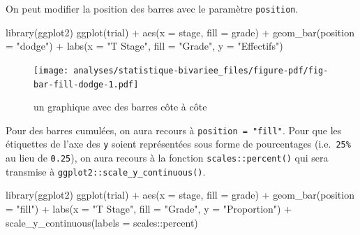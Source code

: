 \documentclass[
  letterpaper,
  DIV=11,
  numbers=noendperiod,
  oneside]{scrreprt}
\newenvironment{Shaded}{\begin{snugshade}}{\end{snugshade}}
\newcommand{\AttributeTok}[1]{\textcolor[rgb]{0.40,0.45,0.13}{#1}}
\newcommand{\FunctionTok}[1]{\textcolor[rgb]{0.28,0.35,0.67}{#1}}
\newcommand{\NormalTok}[1]{\textcolor[rgb]{0.00,0.23,0.31}{#1}}
\newcommand{\SpecialCharTok}[1]{\textcolor[rgb]{0.37,0.37,0.37}{#1}}
\newcommand{\StringTok}[1]{\textcolor[rgb]{0.13,0.47,0.30}{#1}}
\begin{document}
On peut modifier la position des barres avec le paramètre
\texttt{position}.

\begin{Shaded}
\begin{Highlighting}[]
\FunctionTok{library}\NormalTok{(ggplot2)}
\FunctionTok{ggplot}\NormalTok{(trial) }\SpecialCharTok{+}
  \FunctionTok{aes}\NormalTok{(}\AttributeTok{x =}\NormalTok{ stage, }\AttributeTok{fill =}\NormalTok{ grade) }\SpecialCharTok{+}
  \FunctionTok{geom\_bar}\NormalTok{(}\AttributeTok{position =} \StringTok{"dodge"}\NormalTok{) }\SpecialCharTok{+}
  \FunctionTok{labs}\NormalTok{(}\AttributeTok{x =} \StringTok{"T Stage"}\NormalTok{, }\AttributeTok{fill =} \StringTok{"Grade"}\NormalTok{, }\AttributeTok{y =} \StringTok{"Effectifs"}\NormalTok{)}
\end{Highlighting}
\end{Shaded}

\begin{figure}[H]

{\centering \texttt{[image: analyses/statistique-bivariee\_files/figure-pdf/fig-bar-fill-dodge-1.pdf]}

}

\caption{\label{fig-bar-fill-dodge}un graphique avec des barres côte à
côte}

\end{figure}

Pour des barres cumulées, on aura recours à
\texttt{position\ =\ "fill"}. Pour que les étiquettes de l'axe des
\texttt{y} soient représentées sous forme de pourcentages
(i.e.~\texttt{25\%} au lieu de \texttt{0.25}), on aura recours à la
fonction \texttt{scales::percent()} qui sera transmise à
\texttt{ggplot2::scale\_y\_continuous()}.

\begin{Shaded}
\begin{Highlighting}[]
\FunctionTok{library}\NormalTok{(ggplot2)}
\FunctionTok{ggplot}\NormalTok{(trial) }\SpecialCharTok{+}
  \FunctionTok{aes}\NormalTok{(}\AttributeTok{x =}\NormalTok{ stage, }\AttributeTok{fill =}\NormalTok{ grade) }\SpecialCharTok{+}
  \FunctionTok{geom\_bar}\NormalTok{(}\AttributeTok{position =} \StringTok{"fill"}\NormalTok{) }\SpecialCharTok{+}
  \FunctionTok{labs}\NormalTok{(}\AttributeTok{x =} \StringTok{"T Stage"}\NormalTok{, }\AttributeTok{fill =} \StringTok{"Grade"}\NormalTok{, }\AttributeTok{y =} \StringTok{"Proportion"}\NormalTok{) }\SpecialCharTok{+}
  \FunctionTok{scale\_y\_continuous}\NormalTok{(}\AttributeTok{labels =}\NormalTok{ scales}\SpecialCharTok{::}\NormalTok{percent)}
\end{Highlighting}
\end{Shaded}
\end{document}
